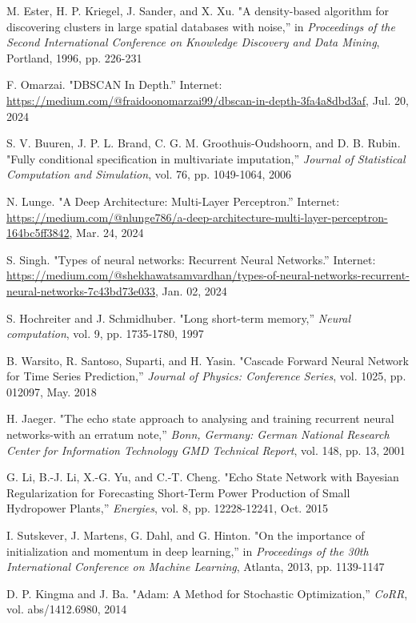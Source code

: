 \begin{thebibliography}{99}
M. Ester, H. P. Kriegel, J. Sander, and X. Xu. "A density-based algorithm for discovering clusters in large spatial databases with noise,'' in \textit{Proceedings of the Second International Conference on Knowledge Discovery and Data Mining}, Portland, 1996, pp. 226-231

F. Omarzai. "DBSCAN In Depth.'' Internet: \url{https://medium.com/@fraidoonomarzai99/dbscan-in-depth-3fa4a8dbd3af}, Jul. 20, 2024

S. V. Buuren, J. P. L. Brand, C. G. M. Groothuis-Oudshoorn, and D. B. Rubin. "Fully conditional specification in multivariate imputation,'' \textit{Journal of Statistical Computation and Simulation}, vol. 76, pp. 1049-1064, 2006

N. Lunge. "A Deep Architecture: Multi-Layer Perceptron.'' Internet: \url{https://medium.com/@nlunge786/a-deep-architecture-multi-layer-perceptron-164bc5ff3842}, Mar. 24, 2024

S. Singh. "Types of neural networks: Recurrent Neural Networks.'' Internet: \url{https://medium.com/@shekhawatsamvardhan/types-of-neural-networks-recurrent-neural-networks-7c43bd73e033}, Jan. 02, 2024

S. Hochreiter and J. Schmidhuber. "Long short-term memory,'' \textit{Neural computation}, vol. 9, pp. 1735-1780, 1997

B. Warsito, R. Santoso, Suparti, and H. Yasin. "Cascade Forward Neural Network for Time Series Prediction,'' \textit{Journal of Physics: Conference Series}, vol. 1025, pp. 012097, May. 2018

H. Jaeger. "The echo state approach to analysing and training recurrent neural networks-with an erratum note,'' \textit{Bonn, Germany: German National Research Center for Information Technology GMD Technical Report}, vol. 148, pp. 13, 2001

G. Li, B.-J. Li, X.-G. Yu, and C.-T. Cheng. "Echo State Network with Bayesian Regularization for Forecasting Short-Term Power Production of Small Hydropower Plants,'' \textit{Energies}, vol. 8, pp. 12228-12241, Oct. 2015

I. Sutskever, J. Martens, G. Dahl, and G. Hinton. "On the importance of initialization and momentum in deep learning,'' in \textit{Proceedings of the 30th International Conference on Machine Learning}, Atlanta, 2013, pp. 1139-1147

D. P. Kingma and J. Ba. "Adam: A Method for Stochastic Optimization,'' \textit{CoRR}, vol. abs/1412.6980, 2014


\end{thebibliography}

